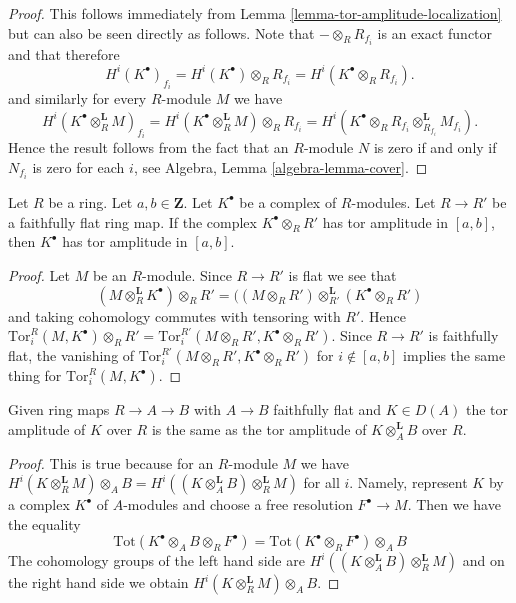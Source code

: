 \begin{proof}
This follows immediately from Lemma \ref{lemma-tor-amplitude-localization}
but can also be seen directly as follows.
Note that $- \otimes_R R_{f_i}$ is an exact functor and that therefore
$$
H^i(K^\bullet)_{f_i} =
H^i(K^\bullet) \otimes_R R_{f_i} = H^i(K^\bullet \otimes_R R_{f_i}).
$$
and similarly for every $R$-module $M$ we have
$$
H^i(K^\bullet \otimes_R^{\mathbf{L}} M)_{f_i} =
H^i(K^\bullet \otimes_R^{\mathbf{L}} M) \otimes_R R_{f_i} =
H^i(K^\bullet \otimes_R R_{f_i} \otimes_{R_{f_i}}^{\mathbf{L}} M_{f_i}).
$$
Hence the result follows from the fact that an $R$-module $N$
is zero if and only if $N_{f_i}$ is zero for each $i$, see
Algebra, Lemma \ref{algebra-lemma-cover}.
\end{proof}

\begin{lemma}
\label{lemma-flat-descent-tor-amplitude}
Let $R$ be a ring. Let $a, b \in \mathbf{Z}$. Let $K^\bullet$
be a complex of $R$-modules. Let $R \to R'$ be a faithfully flat
ring map. If the complex $K^\bullet \otimes_R R'$ has tor amplitude
in $[a, b]$, then $K^\bullet$ has tor amplitude in $[a, b]$.
\end{lemma}

\begin{proof}
Let $M$ be an $R$-module. Since $R \to R'$ is flat we see that
$$
(M \otimes_R^{\mathbf{L}} K^\bullet) \otimes_R R'
=
((M \otimes_R R') \otimes_{R'}^{\mathbf{L}} (K^\bullet \otimes_R R')
$$
and taking cohomology commutes with tensoring with $R'$.
Hence $\text{Tor}_i^R(M, K^\bullet) \otimes_R R' =
\text{Tor}_i^{R'}(M \otimes_R R', K^\bullet \otimes_R R')$.
Since $R \to R'$ is faithfully flat, the vanishing of
$\text{Tor}_i^{R'}(M \otimes_R R', K^\bullet \otimes_R R')$ for
$i \not \in [a, b]$ implies the same thing for
$\text{Tor}_i^R(M, K^\bullet)$.
\end{proof}

\begin{lemma}
\label{lemma-no-change-tor-amplitude}
Given ring maps $R \to A \to B$ with $A \to B$ faithfully flat
and $K \in D(A)$ the tor amplitude of $K$ over $R$
is the same as the tor amplitude of $K \otimes_A^\mathbf{L} B$
over $R$.
\end{lemma}

\begin{proof}
This is true because for an $R$-module $M$ we have
$H^i(K \otimes_R^\mathbf{L} M) \otimes_A B =
H^i((K \otimes_A^\mathbf{L} B) \otimes_R^\mathbf{L} M)$
for all $i$. Namely, represent $K$ by a complex
$K^\bullet$ of $A$-modules and choose a free resolution
$F^\bullet \to M$. Then we have the equality
$$
\text{Tot}(K^\bullet \otimes_A B \otimes_R F^\bullet) =
\text{Tot}(K^\bullet \otimes_R F^\bullet) \otimes_A B
$$
The cohomology groups of the left hand side are
$H^i((K \otimes_A^\mathbf{L} B) \otimes_R^\mathbf{L} M)$
and on the right hand side we obtain
$H^i(K \otimes_R^\mathbf{L} M) \otimes_A B$.
\end{proof}

